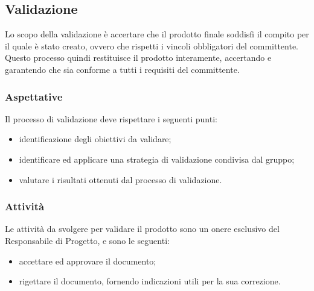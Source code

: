 \subsection{Validazione}
Lo scopo della validazione è accertare che il prodotto finale soddisfi il compito per il quale è stato creato, ovvero che rispetti i vincoli obbligatori del committente. Questo processo quindi restituisce il prodotto interamente, accertando e garantendo che sia conforme a tutti i requisiti del committente.

\subsubsection{Aspettative}
Il processo di validazione deve rispettare i seguenti punti:
\begin{itemize}
	\item identificazione degli obiettivi da validare;
	\item identificare ed applicare una strategia di validazione condivisa dal gruppo;
	\item valutare i risultati ottenuti dal processo di validazione.
\end{itemize}

\subsubsection{Attività}
Le attività da svolgere per validare il prodotto sono un onere esclusivo del Responsabile di Progetto, e sono le seguenti:
\begin{itemize}
	\item accettare ed approvare il documento;
	\item rigettare il documento, fornendo indicazioni utili per la sua correzione.
\end{itemize}


